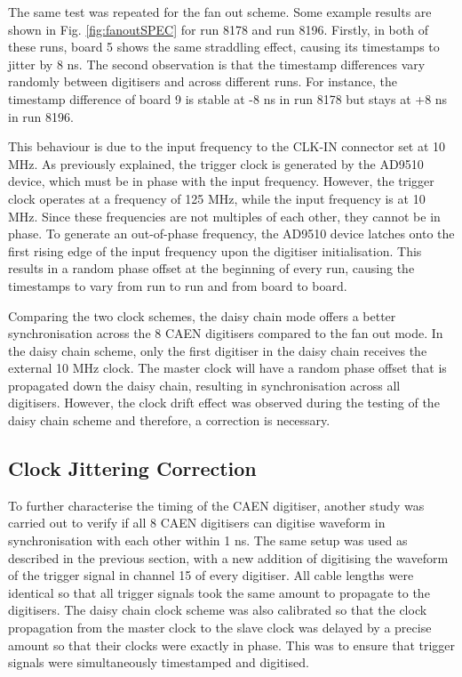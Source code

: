 The same test was repeated for the fan out scheme. %
Some example results are shown in Fig. \ref{fig:fanoutSPEC} for run 8178 and run 8196.
Firstly, in both of these runs, board 5 shows the same straddling effect, causing its timestamps to jitter by 8 ns.
The second observation is that the timestamp differences vary randomly between digitisers and across different runs. 
For instance, the timestamp difference of board 9 is stable at -8 ns in run 8178 but stays at +8 ns in run 8196.

This behaviour is due to the input frequency to the CLK-IN connector set at 10 MHz.
As previously explained, the trigger clock is generated by the AD9510 device, which must be in phase with the input frequency. 
However, the trigger clock operates at a frequency of 125 MHz, while the input frequency is at 10 MHz. 
Since these frequencies are not multiples of each other, they cannot be in phase.
To generate an out-of-phase frequency, the AD9510 device latches onto the first rising edge of the input frequency upon the digitiser initialisation.
This results in a random phase offset at the beginning of every run, causing the timestamps to vary from run to run and from board to board. 

Comparing the two clock schemes, the daisy chain mode offers a better synchronisation across the 8 CAEN digitisers compared to the fan out mode.
In the daisy chain scheme, only the first digitiser in the daisy chain receives the external 10 MHz clock.
The master clock will have a random phase offset that is propagated down the daisy chain, resulting in synchronisation across all digitisers.
However, the clock drift effect was observed during the testing of the daisy chain scheme and therefore, a correction is necessary.

\subsection{Clock Jittering Correction}
\label{sec:jitter_correction}

To further characterise the timing of the CAEN digitiser, another study was carried out to verify if all 8 CAEN digitisers can digitise waveform in synchronisation with each other within 1 ns. 
The same setup was used as described in the previous section, with a new addition of digitising the waveform of the trigger signal in channel 15 of every digitiser.
All cable lengths were identical so that all trigger signals took the same amount to propagate to the digitisers.
The daisy chain clock scheme was also calibrated so that the clock propagation from the master clock to the slave clock was delayed by a precise amount so that their clocks were exactly in phase.
This was to ensure that trigger signals were simultaneously timestamped and digitised.

